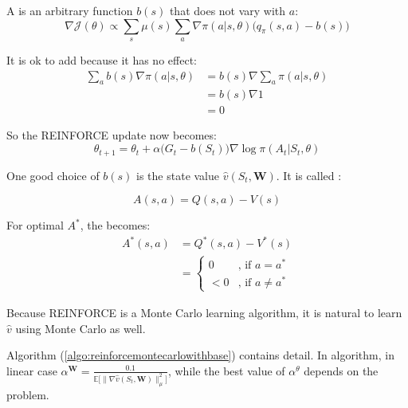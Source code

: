 A  is an arbitrary function $b(s)$ that does not vary with $a$:
\begin{equation}
	\nabla \mathcal{J}(\theta ) \propto \sum_s \mu(s) \sum_a \nabla \pi(a|s,\mathbb{\theta} ) \Big( q_\pi(s,a) - b(s)\Big)
\end{equation}

It is ok to add  because it has no effect:
\begin{equation}
	\begin{aligned}
		\sum_a b(s)\nabla \pi(a|s,\theta) &= b(s) \nabla \sum_a \pi(a|s,\theta) \\
		&= b(s) \nabla 1 \\
		&= 0
	\end{aligned}
\end{equation}

So the REINFORCE update now becomes:
\begin{equation}
	\theta_{t+1} = \theta_t + \alpha \Big( G_t - b(S_t) \Big) \nabla \log \pi(A_t|S_t,\mathbb{\theta})
\end{equation}

One good choice of $b(s)$ is the state value $\widehat{v}(S_t,\mathbf{W})$. It is called :

\begin{equation}
	A(s,a) = Q(s,a) - V(s)	
\end{equation}


For optimal $A^*$, the  becomes:
\begin{equation}
	\begin{aligned}
		A^*(s,a) &= Q^*(s,a) - V^*(s)\\
		&= \begin{cases}
			0 & \text{, if } a = a^* \\
			<0 & \text{, if } a \neq a^*
		\end{cases}
	\end{aligned}
\end{equation}


Because REINFORCE is a Monte Carlo learning algorithm, it is natural to learn $\widehat{v}$ using Monte Carlo as well.




Algorithm (\ref{algo:reinforcemontecarlowithbase}) contains detail. In algorithm, in linear case $\alpha^\mathbf{W} = \frac{0.1}{\mathbb{E} \big[ \| \nabla \widehat{v}(S_t,\mathbf{W}) \|_\mu^2 \big]}$, while the best value of $\alpha^\theta$  depends on the problem.

